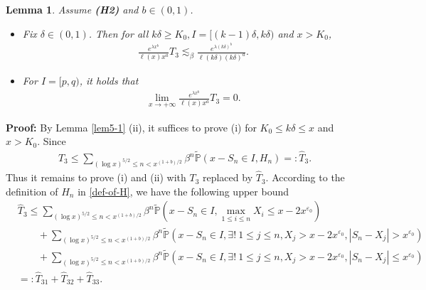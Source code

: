\documentclass[11pt]{article}
\newtheorem{lemma}[thrm]{Lemma}
\numberwithin{equation}{section}
\begin{document}
\begin{lemma}\label{lem5-2}
	Assume {\bf(H2)} and $b\in (0,1)$.  
	\begin{itemize}
		\item[(i)] Fix $\delta\in (0,1)$. Then for all $k\delta \geq K_0, I= [(k-1)\delta, k\delta)$ and $x>K_0$, 
		\begin{align}
			\frac{e^{\lambda x^b}}{\ell(x)x^a }T_3 \lesssim_{\beta } \frac{e^{\lambda (k\delta)^b}}{\ell(k\delta)(k\delta)^a} .
		\end{align}
		\item[(ii)] For $I=[p, q)$, it holds that 
		\begin{align}
			\lim_{x\to+\infty} \frac{e^{\lambda x^b}}{\ell(x)x^a }T_3  =0.
		\end{align}
	\end{itemize}
\end{lemma}
\textbf{Proof: }  
By Lemma \ref{lem5-1} (ii), it suffices to prove (i) for $K_0\leq k\delta \leq x$ and $x>K_0$. Since 
\begin{align}
	T_3\leq \sum_{(\log x)^{5/2}\leq n <x^{(1+b)/2}} \beta^{n}\widetilde{\mathbb{P}}\left( x-S_n\in I, H_n \right) =: \widehat{T}_3. 
\end{align}
Thus it remains to prove (i) and (ii) with $T_3$ replaced by $\widehat{T}_3$. 
According to the definition of $H_n$ in \eqref{def-of-H}, we have the following upper bound 
\begin{align}\label{decomposition-T-3}
	&\widehat{T}_3 \leq \sum_{(\log x)^{5/2}\leq n <x^{(1+b)/2}} \beta^{n}\widetilde{\mathbb{P}}\left( x-S_n\in I, \max_{1\leq i\leq n} X_i \leq x-2x^{\varepsilon_0}  \right)  \nonumber\\
	&\qquad +\sum_{(\log x)^{5/2}\leq n <x^{(1+b)/2}} \beta^{n}\widetilde{\mathbb{P}}\left( x-S_n\in I, \exists ! \ 1\leq j\leq n, X_j>x-2x^{\varepsilon_0} , |S_n-X_j| >x^{\varepsilon_0}\right) \nonumber\\
	&\qquad +\sum_{(\log x)^{5/2}\leq n <x^{(1+b)/2}} \beta^{n}\widetilde{\mathbb{P}}\left( x-S_n\in I, \exists ! \ 1\leq j\leq n, X_j>x-2x^{\varepsilon_0} , |S_n-X_j| \leq x^{\varepsilon_0} \right) \nonumber\\
	&=: \widehat{T}_{31}+ \widehat{T}_{32}+ \widehat{T}_{33}.
\end{align}
\end{document}
